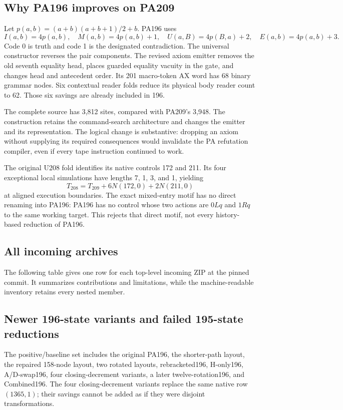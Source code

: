 \documentclass[11pt,a4paper]{article}
\begin{document}
\subsection{Why PA196 improves on PA209}

Let $p(a,b)=(a+b)(a+b+1)/2+b$. PA196 uses
\[
 I(a,b)=4p(a,b),\quad M(a,b)=4p(a,b)+1,\quad
 U(a,B)=4p(B,a)+2,\quad E(a,b)=4p(a,b)+3.
\]
Code 0 is truth and code 1 is the designated contradiction. The universal
constructor reverses the pair components. The revised axiom emitter removes
the old seventh equality head, places guarded equality vacuity in the gate,
and changes head and antecedent order. Its 201 macro-token AX word has 68
binary grammar nodes. Six contextual reader folds reduce its physical body
reader count to 62. Those six savings are already included in 196.

The complete source has 3,812 sites, compared with PA209's 3,948. The
construction retains the command-search architecture and changes the
emitter and its representation. The logical change is substantive:
dropping an axiom without supplying its required consequences would
invalidate the PA refutation compiler, even if every tape instruction
continued to work.

The original U208 fold identifies its native controls 172 and 211. Its
four exceptional local simulations have lengths 7, 1, 3, and 1, yielding
\[
 T_{208}=T_{209}+6N(172,0)+2N(211,0)
\]
at aligned execution boundaries. The exact mixed-entry motif has no direct
renaming into PA196: PA196 has no control whose two actions are
$0Lq$ and $1Rq$ to the same working target. This rejects that direct motif,
not every history-based reduction of PA196.

\subsection{All incoming archives}

The following table gives one row for each top-level incoming ZIP at the
pinned commit. It summarizes contributions and limitations, while the
machine-readable inventory retains every nested member.



\subsection{Newer 196-state variants and failed 195-state reductions}

The positive/baseline set includes the original PA196, the shorter-path
layout, the repaired 158-node layout, two rotated layouts, rebracketed196,
H-only196, A/D-swap196, four closing-decrement variants, a later
twelve-rotation196, and Combined196. The four closing-decrement variants
replace the same native row $(1365,1)$; their savings cannot be added as
if they were disjoint transformations.
\end{document}
